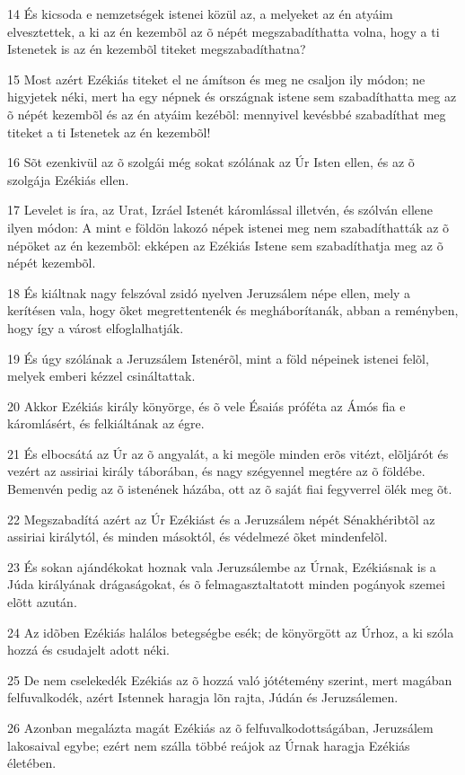 \par 14 És kicsoda e nemzetségek istenei közül az, a melyeket az én atyáim elvesztettek, a ki az én kezembõl az õ népét megszabadíthatta volna, hogy a ti Istenetek is az én kezembõl titeket megszabadíthatna?
\par 15 Most azért Ezékiás titeket el ne ámítson és meg ne csaljon ily módon; ne higyjetek néki, mert ha egy népnek és országnak istene sem szabadíthatta meg az õ népét kezembõl és az én atyáim kezébõl: mennyivel kevésbbé szabadíthat meg titeket a ti Istenetek az én kezembõl!
\par 16 Sõt ezenkivül az õ szolgái még sokat szólának az Úr Isten ellen, és az õ szolgája Ezékiás ellen.
\par 17 Levelet is íra, az Urat, Izráel Istenét káromlással illetvén, és szólván ellene ilyen módon: A mint e földön lakozó népek istenei meg nem szabadíthatták az õ népöket az én kezembõl: ekképen az Ezékiás Istene sem szabadíthatja meg az õ népét kezembõl.
\par 18 És kiáltnak nagy felszóval zsidó nyelven Jeruzsálem népe ellen, mely a kerítésen vala, hogy õket megrettentenék és megháborítanák, abban a reményben, hogy így a várost elfoglalhatják.
\par 19 És úgy szólának a Jeruzsálem Istenérõl, mint a föld népeinek istenei felõl, melyek emberi kézzel csináltattak.
\par 20 Akkor Ezékiás király könyörge, és õ vele Ésaiás próféta az Ámós fia e káromlásért, és felkiáltának az égre.
\par 21 És elbocsátá az Úr az õ angyalát, a ki megöle minden erõs vitézt, elõljárót és vezért az assiriai király táborában, és nagy szégyennel megtére az õ földébe. Bemenvén pedig az õ istenének házába, ott az õ saját fiai  fegyverrel ölék meg õt.
\par 22 Megszabadítá azért az Úr Ezékiást és a Jeruzsálem népét Sénakhéribtõl az assiriai királytól, és minden másoktól, és védelmezé õket mindenfelõl.
\par 23 És sokan ajándékokat hoznak vala Jeruzsálembe az Úrnak, Ezékiásnak is a Júda királyának drágaságokat, és õ felmagasztaltatott minden pogányok szemei elõtt azután.
\par 24 Az idõben Ezékiás halálos betegségbe esék; de könyörgött az Úrhoz, a ki szóla hozzá és csudajelt adott néki.
\par 25 De nem cselekedék Ezékiás az õ hozzá való jótétemény szerint, mert magában felfuvalkodék, azért Istennek haragja lõn rajta, Júdán és Jeruzsálemen.
\par 26 Azonban megalázta magát Ezékiás az õ felfuvalkodottságában, Jeruzsálem lakosaival egybe; ezért nem szálla többé reájok az Úrnak haragja Ezékiás életében.
